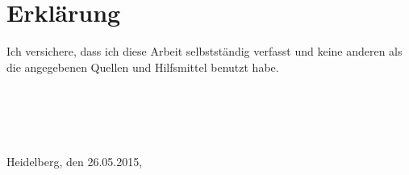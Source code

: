 \chapter*{Erkl\"{a}rung}

Ich versichere, dass ich diese Arbeit selbstst\"{a}ndig verfasst und keine anderen als die angegebenen Quellen und Hilfsmittel benutzt habe.
\\\\\\\\\\\\
Heidelberg, den 26.05.2015,


